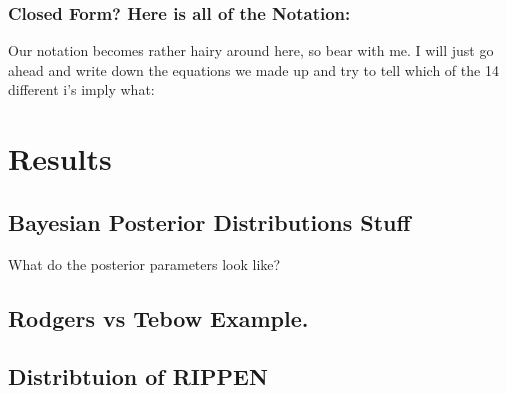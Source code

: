 \documentclass[aoas]{imsart}\usepackage[]{graphicx}\usepackage[]{color}
\begin{document}
\subsubsection{Closed Form? Here is all of the Notation:}
Our notation becomes rather hairy around here, so bear with me. I will just go ahead and write down the equations we made up and try to tell which of the 14 different i's imply what: 

% 	
% 	



\section{Results}
\subsection{Bayesian Posterior Distributions Stuff}
What do the posterior parameters look like? 

\subsection{Rodgers vs Tebow Example. }

\subsection{Distribtuion of RIPPEN}
\end{document}
